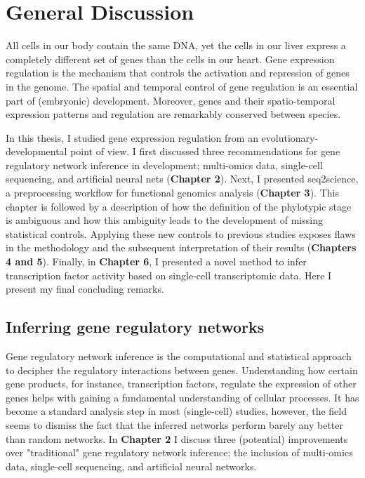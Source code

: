 \chapter{General Discussion}\thumbforchapter
\newpage

\noindent
All cells in our body contain the same DNA, yet the cells in our liver express a completely different set of genes than the cells in our heart. Gene expression regulation is the mechanism that controls the activation and repression of genes in the genome. The spatial and temporal control of gene regulation is an essential part of (embryonic) development. Moreover, genes and their spatio-temporal expression patterns and regulation are remarkably conserved between species.

In this thesis, I studied gene expression regulation from an evolutionary-developmental point of view. I first discussed three recommendations for gene regulatory network inference in development; multi-omics data, single-cell sequencing, and artificial neural nets (\textbf{Chapter 2}). Next, I presented seq2science, a preprocessing workflow for functional genomics analysis (\textbf{Chapter 3}). This chapter is followed by a description of how the definition of the phylotypic stage is ambiguous and how this ambiguity leads to the development of missing statistical controls. Applying these new controls to previous studies exposes flaws in the methodology and the subsequent interpretation of their results (\textbf{Chapters 4 and 5}). Finally, in \textbf{Chapter 6}, I presented a novel method to infer transcription factor activity based on single-cell transcriptomic data. Here I present my final concluding remarks.

\section{Inferring gene regulatory networks}

Gene regulatory network inference is the computational and statistical approach to decipher the regulatory interactions between genes. Understanding how certain gene products, for instance, transcription factors, regulate the expression of other genes helps with gaining a fundamental understanding of cellular processes. It has become a standard analysis step in most (single-cell) studies, however, the field seems to dismiss the fact that the inferred networks perform barely any better than random networks\cite{McCalla_2021,Chen_2018,Pratapa_2020}. In \textbf{Chapter 2} I discuss three (potential) improvements over "traditional" gene regulatory network inference; the inclusion of multi-omics data, single-cell sequencing, and artificial neural networks.

